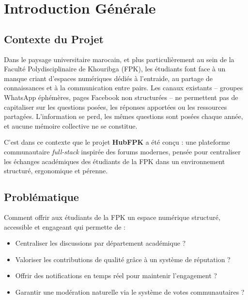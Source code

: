 \documentclass[12pt, a4paper]{report}
\begin{document}
\tableofcontents
\newpage

\chapter{Introduction Générale}

\section{Contexte du Projet}

Dans le paysage universitaire marocain, et plus particulièrement au sein de la Faculté Polydisciplinaire de Khouribga (FPK), les étudiants font face à un manque criant d'espaces numériques dédiés à l'entraide, au partage de connaissances et à la communication entre pairs. Les canaux existants -- groupes WhatsApp éphémères, pages Facebook non structurées -- ne permettent pas de capitaliser sur les questions posées, les réponses apportées ou les ressources partagées. L'information se perd, les mêmes questions sont posées chaque année, et aucune mémoire collective ne se constitue.

C'est dans ce contexte que le projet \textbf{HubFPK} a été conçu : une plateforme communautaire \textit{full-stack} inspirée des forums modernes, pensée pour centraliser les échanges académiques des étudiants de la FPK dans un environnement structuré, ergonomique et pérenne.

\section{Problématique}

Comment offrir aux étudiants de la FPK un espace numérique structuré, accessible et engageant qui permette de :
\begin{itemize}[leftmargin=2cm]
    \item Centraliser les discussions par département académique ?
    \item Valoriser les contributions de qualité grâce à un système de réputation ?
    \item Offrir des notifications en temps réel pour maintenir l'engagement ?
    \item Garantir une modération naturelle via le système de votes communautaires ?
\end{itemize}
\end{document}
